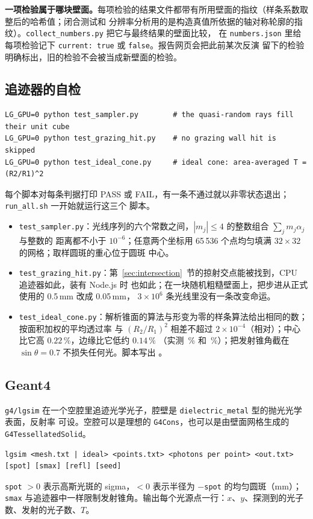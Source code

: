 \documentclass[11pt,a4paper,fontset=fandol]{ctexart}
\newcommand{\code}[1]{\texttt{#1}}
\begin{document}
\textbf{一项检验属于哪块壁面。}每项检验的结果文件都带有所用壁面的指纹（样条系数取整后的哈希值；闭合测试和
分辨率分析用的是构造真值所依据的轴对称轮廓的指纹）。\code{collect\_numbers.py} 把它与最终结果的壁面比较，
在 \code{numbers.json} 里给每项检验记下 \code{current: true} 或 \code{false}。报告网页会把此前某次反演
留下的检验明确标出，旧的检验不会被当成新壁面的检验。

\subsection{追迹器的自检}

\begin{lstlisting}
LG_GPU=0 python test_sampler.py        # the quasi-random rays fill their unit cube
LG_GPU=0 python test_grazing_hit.py    # no grazing wall hit is skipped
LG_GPU=0 python test_ideal_cone.py     # ideal cone: area-averaged T = (R2/R1)^2
\end{lstlisting}
每个脚本对每条判据打印 PASS 或 FAIL，有一条不通过就以非零状态退出；\code{run\_all.sh} 一开始就运行这三个
脚本。
\begin{itemize}
\item \code{test\_sampler.py}：光线序列的六个常数之间，$|m_j|\le4$ 的整数组合 $\sum_j m_j\alpha_j$ 与整数的
距离都不小于 $10^{-6}$；任意两个坐标用 65\,536 个点均匀填满 $32\times32$ 的网格；取样圆斑的重心位于圆斑
中心。
\item \code{test\_grazing\_hit.py}：第~\ref{sec:intersection}~节的掠射交点能被找到，CPU 追迹器如此，装有
Node.js 时  也如此；在一块随机粗糙壁面上，把步进从正式使用的 0.5\,mm 改成 0.05\,mm，
$3\times10^{6}$ 条光线里没有一条改变命运。
\item \code{test\_ideal\_cone.py}：解析锥面的算法与形变为零的样条算法给出相同的数；按面积加权的平均透过率
与 $(R_2/R_1)^2$ 相差不超过 $2\times10^{-4}$（相对）；中心比它高 $0.22\,\%$，边缘比它低约 $0.14\,\%$
（实测 \IdealCentreDev\,\% 和 \IdealRimDev\,\%）；把发射锥角截在 $\sin\theta=0.7$ 不损失任何光。脚本写出
。
\end{itemize}

\subsection{Geant4}

\code{g4/lgsim} 在一个空腔里追迹光学光子，腔壁是 \code{dielectric\_metal} 型的抛光光学表面，反射率
可设。空腔可以是理想的 \code{G4Cons}，也可以是由壁面网格生成的 \code{G4TessellatedSolid}。
\begin{lstlisting}
lgsim <mesh.txt | ideal> <points.txt> <photons per point> <out.txt> [spot] [smax] [refl] [seed]
\end{lstlisting}
\code{spot} $>0$ 表示高斯光斑的 sigma，$<0$ 表示半径为 $-$\code{spot} 的均匀圆斑（mm）；\code{smax}
与追迹器中一样限制发射锥角。输出每个光源点一行：$x$、$y$、探测到的光子数、发射的光子数、$T$。
\end{document}
